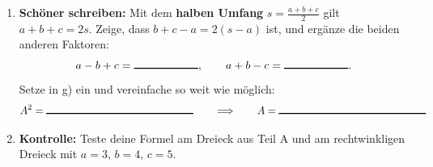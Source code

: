 \documentclass[11pt,oneside]{article}
\begin{document}
\begin{aufgabe}
\begin{enumerate}[label=\alph*), resume]
	\end{enumerate}
	\begin{enumerate}[label=\alph*), resume]
		\item \textbf{Schöner schreiben:} Mit dem \textbf{halben Umfang} $s=\frac{a+b+c}{2}$ gilt $a+b+c=2s$. Zeige, dass $b+c-a=2(s-a)$ ist, und ergänze die beiden anderen Faktoren:
		\[a-b+c=\gap{2},\qquad a+b-c=\gap{2}.\]
		Setze in g) ein und vereinfache so weit wie möglich:
		\[A^2=\gap{5}\qquad\Longrightarrow\qquad A=\gap{5}\]
		\item \textbf{Kontrolle:} Teste deine Formel am Dreieck aus Teil A und am rechtwinkligen Dreieck mit $a=3$, $b=4$, $c=5$.
	\end{enumerate}
\end{aufgabe}

\newpage
\end{document}
